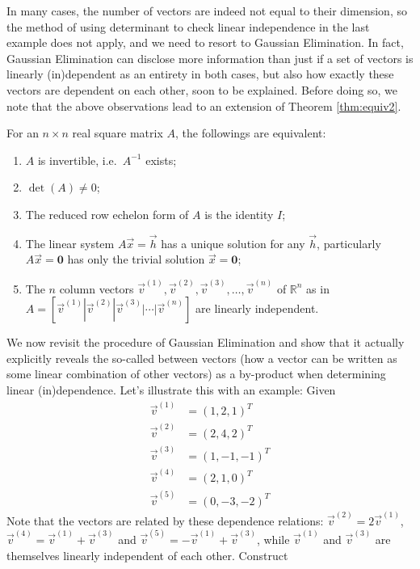 In many cases, the number of vectors are indeed not equal to their dimension, so the method of using determinant to check linear independence in the last example does not apply, and we need to resort to Gaussian Elimination. In fact, Gaussian Elimination can disclose more information than just if a set of vectors is linearly (in)dependent as an entirety in both cases, but also how exactly these vectors are dependent on each other, soon to be explained. Before doing so, we note that the above observations lead to an extension of Theorem \ref{thm:equiv2}.
\begin{thm}
\label{thm:equiv3}
For an $n \times n$ real square matrix $A$, the followings are equivalent:
\begin{enumerate}[label=(\alph*)]
\item $A$ is invertible, i.e.\ $A^{-1}$ exists;
\item $\det(A) \neq 0$;
\item The reduced row echelon form of $A$ is the identity $I$;
\item The linear system $A\vec{x} = \vec{h}$ has a unique solution for any $\vec{h}$, particularly $A\vec{x} = \textbf{0}$ has only the trivial solution $\vec{x} = \textbf{0}$;
\item The $n$ column vectors $\vec{v}^{(1)}, \vec{v}^{(2)}, \vec{v}^{(3)}, \ldots, \vec{v}^{(n)}$ of $\mathbb{R}^n$ as in $A = [\vec{v}^{(1)}|\vec{v}^{(2)}|\vec{v}^{(3)}|\cdots|\vec{v}^{(n)}]$ are linearly independent.
\end{enumerate}
\end{thm}
We now revisit the procedure of Gaussian Elimination and show that it actually explicitly reveals the so-called  between vectors (how a vector can be written as some linear combination of other vectors) as a by-product when determining linear (in)dependence. Let's illustrate this with an example: Given
\begin{align*}
\vec{v}^{(1)} &= (1,2,1)^T \\
\vec{v}^{(2)} &= (2,4,2)^T \\
\vec{v}^{(3)} &= (1,-1,-1)^T \\
\vec{v}^{(4)} &= (2,1,0)^T \\
\vec{v}^{(5)} &= (0,-3,-2)^T
\end{align*}
Note that the vectors are related by these dependence relations: $\vec{v}^{(2)} = 2\vec{v}^{(1)}$, $\vec{v}^{(4)} = \vec{v}^{(1)} + \vec{v}^{(3)}$ and $\vec{v}^{(5)} = -\vec{v}^{(1)} + \vec{v}^{(3)}$, while $\vec{v}^{(1)}$ and $\vec{v}^{(3)}$ are themselves linearly independent of each other. Construct 
